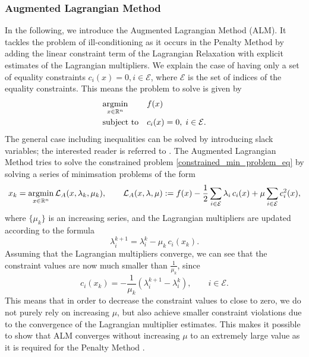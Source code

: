 \subsubsection{Augmented Lagrangian Method}
In the following, we introduce the Augmented Lagrangian Method (ALM). It tackles the problem of ill-conditioning as it occurs in the Penalty Method by adding the linear constraint term of the Lagrangian Relaxation with explicit estimates of the Lagrangian multipliers. We explain the case of having only a set of equality constraints ${c_i(x) = 0, i \in \mathcal{E}}$, where $\mathcal{E}$ is the set of indices of the equality constraints. This means the problem to solve is given by 
\begin{equation}
\label{constrained_min_problem_eq}
\begin{aligned}
& \underset{x \in \mathbb{R}^n}{\operatorname*{argmin}}
& & f(x) \\
& \text{subject to}
& & c_i(x) = 0, \; i \in \mathcal{E}.
\end{aligned}
\end{equation}
The general case including inequalities can be solved by introducing slack variables; the interested reader is referred to \cite{NoceWrig06}.
The Augmented Lagrangian Method tries to solve the constrained problem \eqref{constrained_min_problem_eq} by solving a series of minimsation problems of the form
\[x_k = \operatorname*{argmin}_{x \in \mathbb{R}^n} \mathcal{L}_A(x, \lambda_k, \mu_k), \qquad \mathcal{L}_A(x, \lambda, \mu) := f(x) - \frac{1}{2}\sum_{i \in \mathcal{E}} \lambda_i \,c_i(x) + \mu \sum_{i \in \mathcal{E}} c_i^2(x),\]
where $\{\mu_k\}$ is an increasing series, and the Lagrangian multipliers are updated according to the formula
\begin{equation}
\lambda_i^{k+1} = \lambda_i^k - \mu_k\,c_i(x_k).
\label{eq:alm_update}
\end{equation}
Assuming that the Lagrangian multipliers converge, we can see that the constraint values are now much smaller than $\frac{1}{\mu_k}$, since 
\[ c_i(x_k) = -\frac{1}{\mu_k}(\lambda_i^{k+1} - \lambda_i^k), \qquad i\in \mathcal{E}. \]
This means that in order to decrease the constraint values to close to zero, we do not purely rely on increasing $\mu$, but also achieve smaller constraint violations due to the convergence of the Lagrangian multiplier estimates. This makes it possible to show that ALM converges without increasing $\mu$ to an extremely large value as it is required for the Penalty Method \cite{NoceWrig06}.


